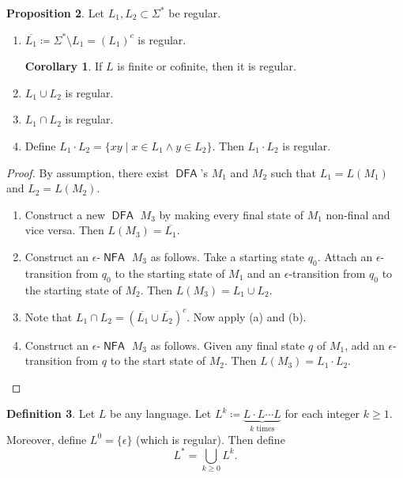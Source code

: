 \documentclass[10pt,letterpaper,cm]{nupset}
\theoremstyle{definition}
\newtheorem{definition}{Definition}[subsection]
\theoremstyle{theorem}
\newtheorem{prop}[definition]{Proposition}
\newtheorem{corollary}[definition]{Corollary}
\theoremstyle{remark}
\newcommand{\1}{\mathbf{1}}
\newcommand{\0}{\vec 0}
\DeclareMathOperator{\DFA}{\mathsf{DFA}}
\DeclareMathOperator{\NFA}{\mathsf{NFA}}
\begin{document}
\begin{prop} Let $L_1, L_2\subset \Sigma^{\ast}$ be regular. 
\begin{enumerate}[label=(\alph*)]
\item $\overline{L_1}\coloneqq \Sigma^{\ast} \setminus L_1 = (L_1)^c$ is regular.
\begin{corollary}
If $L$ is finite or cofinite, then it is regular.
\end{corollary}
\item $L_1 \cup L_2$ is regular.
\item $L_1 \cap L_2$ is regular. 
\item Define $L_1\cdot L_2 = \{xy \mid x\in L_1 \land y\in L_2\}$. Then $L_1 \cdot L_2$ is regular. 
\end{enumerate}
\end{prop} 
\begin{proof} By assumption, there exist $\DFA$'s $M_1$ and $M_2$ such that $L_1 = L(M_1)$ and $L_2 = L(M_2)$.
\begin{enumerate}[label=(\alph*)]
\item Construct a new $\DFA$ $M_3$ by making every final state of $M_1$ non-final and vice versa. Then $L(M_3) = \overline{L_1}$.
\item Construct an $\epsilon$-$\NFA$ $M_3$ as follows. Take a starting state $q_0$. Attach  an $\epsilon$-transition  from $q_0$ to the starting state of $M_1$  and  an $\epsilon$-transition from $q_0$ to the starting state of $M_2$. Then $L(M_3) = L_1 \cup L_2$.
\item Note that $L_1 \cap L_2 = (\overline{L_1} \cup \overline{L_2})^c$.  Now apply (a) and (b).
\item Construct an $\epsilon$-$\NFA$ $M_3$ as follows. Given any final state $q$ of $M_1$, add an $\epsilon$-transition from $q$ to the start state of $M_2$. Then $L(M_3) = L_1\cdot L_2$.
\end{enumerate}
\end{proof}

\begin{definition}
Let $L$ be any language. Let $L^k \coloneqq \underbrace{L\cdot L \cdots L}_{k \text{ times}}$ for each integer $k\geq 1$. Moreover, define $L^0 = \{\epsilon\}$ (which is regular). Then define $$L^{\ast} = \bigcup_{k\geq 0} L^k.$$
\end{definition}
\end{document}
